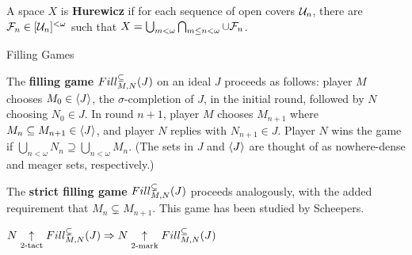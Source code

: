   \begin{definition}
    A space $X$ is \textbf{Hurewicz} if for each sequence of open covers $\mathcal{U}_n$, there are $\mathcal{F}_n \in [\mathcal{U}_n]^{<\omega}$ such that $X=\bigcup_{m<\omega}\bigcap_{m\leq n<\omega}\cup\mathcal{F}_n$.
  \end{definition}






















\newpage

  \centerline{Filling Games}

  \begin{definition}
    The \textbf{filling game} $Fill^{\subseteq}_{M,N}(J)$ on an ideal $J$ proceeds as follows: player $M$ chooses $M_0 \in \langle J\rangle$, the $\sigma$-completion of $J$, in the initial round, followed by $N$ choosing $N_0\in J$. In round $n+1$, player $M$ chooses $M_{n+1}$ where $M_n\subseteq M_{n+1}\in\langle J\rangle$, and player $N$ replies with $N_{n+1}\in J$. Player $N$ wins the game if $\bigcup_{n<\omega} N_n \supseteq \bigcup_{n<\omega} M_n$. (The sets in $J$ and $\langle J\rangle$ are thought of as nowhere-dense and meager sets, respectively.)

    The \textbf{strict filling game} $Fill^{\subsetneq}_{M,N}(J)$ proceeds analogously, with the added requirement that $M_n\subsetneq M_{n+1}$. This game has been studied by Scheepers.
  \end{definition}

  \begin{theorem}
    $N\underset{2\text{-tact}}{\uparrow}Fill^{\subsetneq}_{M,N}(J) \Rightarrow N\underset{2\text{-mark}}{\uparrow}Fill^{\subseteq}_{M,N}(J)$
  \end{theorem}

